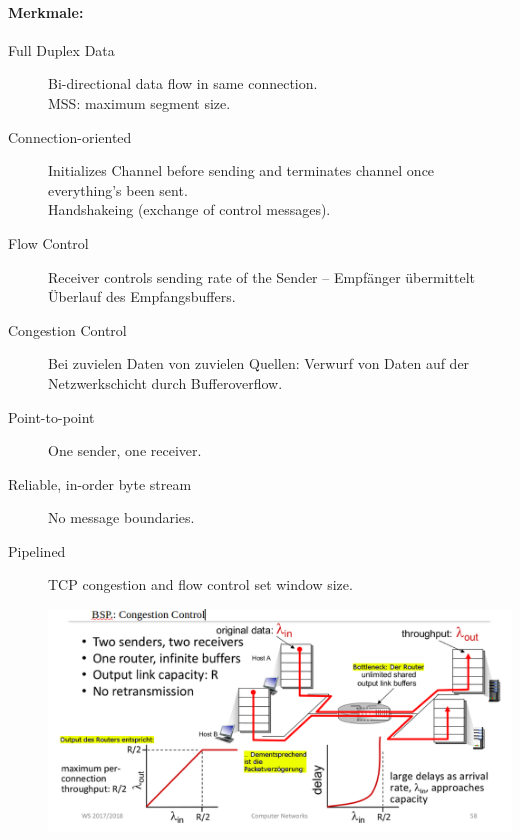 \documentclass{scrartcl}
\begin{document}
    \paragraph{Merkmale:}
    \begin{description}
        \item [Full Duplex Data] Bi-directional data flow in same connection.\\MSS: maximum segment size.
        
        \item [Connection-oriented] Initializes Channel before sending and terminates channel once everything's been sent.
        \\Handshakeing (exchange of control messages).
        
        \item [Flow Control] Receiver controls sending rate of the Sender -- Empfänger übermittelt Überlauf des Empfangsbuffers.
        \item [Congestion Control] Bei zuvielen Daten von zuvielen Quellen: Verwurf von Daten auf der Netzwerkschicht durch Bufferoverflow.
        \item [Point-to-point] One sender, one receiver.
        \item [Reliable, in-order byte stream] No message boundaries.
        \item [Pipelined] TCP congestion and flow control set window size.
        
        \begin{center}
            \includegraphics[width=\textwidth]{CongestionControl.png}
    \end{center}
    \end{description}
\end{document}
